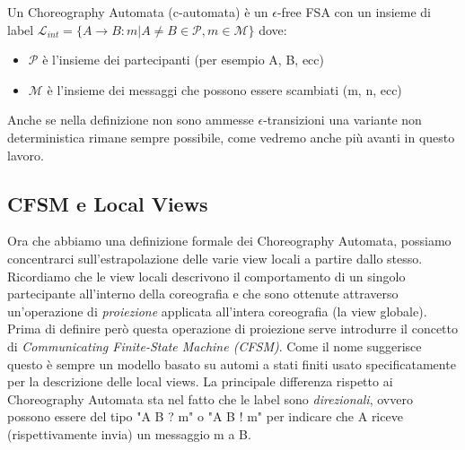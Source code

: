 \begin{definition}
    \label{def:Choreography_Automata}
    Un Choreography Automata (c-automata) è un $\epsilon$-free FSA con un insieme di label $\mathcal{L}_{int} = \{ A \rightarrow B : m | A \neq B \in \mathcal{P}, m \in \mathcal{M} \}$ dove:
    \begin{itemize}
        \item $\mathcal{P}$ è l'insieme dei partecipanti (per esempio A, B, ecc)
        \item $\mathcal{M}$ è l'insieme dei messaggi che possono essere scambiati (m, n, ecc)
    \end{itemize}
\end{definition}
\begin{remark}
    Anche se nella definizione non sono ammesse $\epsilon$-transizioni una variante non deterministica rimane sempre possibile, come vedremo anche più avanti in questo lavoro.
\end{remark}

\subsection{CFSM e Local Views}
Ora che abbiamo una definizione formale dei Choreography Automata, possiamo concentrarci sull'estrapolazione delle varie view locali a partire dallo stesso. Ricordiamo che le view locali descrivono il comportamento di un singolo partecipante all'interno della coreografia e che sono ottenute attraverso un'operazione di \emph{proiezione} applicata all'intera coreografia (la view globale). Prima di definire però questa operazione di proiezione serve introdurre il concetto di \emph{Communicating Finite-State Machine (CFSM)}. Come il nome suggerisce questo è sempre un modello basato su automi a stati finiti usato specificatamente per la descrizione delle local views. La principale differenza rispetto ai Choreography Automata sta nel fatto che le label sono \emph{direzionali}, ovvero possono essere del tipo "A B ? m" o "A B ! m" per indicare che A riceve (rispettivamente invia) un messaggio m a B.

